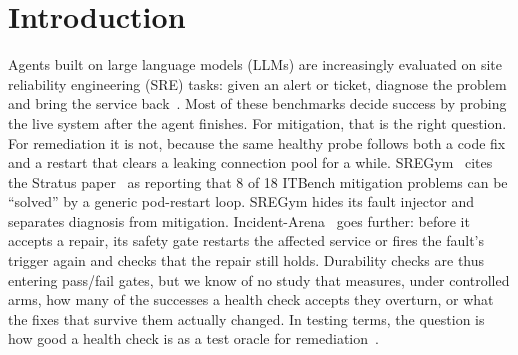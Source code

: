
\section{Introduction}

Agents built on large language models (LLMs) are increasingly evaluated on site reliability engineering (SRE) tasks: given
an alert or ticket, diagnose the problem and bring the service
back~\citep{chen2025aiopslab,jha2025itbench,clark2026sregym}. Most of these benchmarks decide success by probing
the live system after the agent finishes. For mitigation, that is the right question. For remediation it is not, because
the same healthy probe follows both a code fix and a restart that clears a leaking connection pool for a while.
SREGym~\citep{clark2026sregym} cites the Stratus paper~\citep{chen2025stratus} as reporting that 8 of 18 ITBench
mitigation problems can be ``solved'' by a generic pod-restart loop. SREGym hides its fault injector and separates
diagnosis from mitigation. Incident-Arena~\citep{fu2026incidentarena} goes further: before it accepts a repair, its safety
gate restarts the affected service or fires the fault's trigger again and checks that the repair still holds. Durability
checks are thus entering pass/fail gates, but we know of no study that measures, under controlled arms, how many of the successes a health check
accepts they overturn, or what the fixes that survive them actually changed. In testing terms, the question is how good
a health check is as a test oracle for remediation~\citep{barr2015oracle}.

